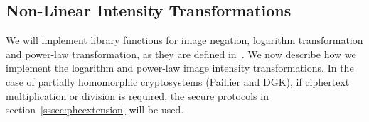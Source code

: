 

\subsection{Non-Linear Intensity Transformations}
We will implement library functions for image negation, logarithm transformation and power-law transformation, as they are defined in~\cite{gonzalez_digital_2008}.
We now describe how we implement the logarithm and power-law image intensity transformations. In the case of partially homomorphic cryptosystems (Paillier and DGK), if ciphertext multiplication or division is required, the secure protocols in section~\ref{sssec:pheextension} will be used.

